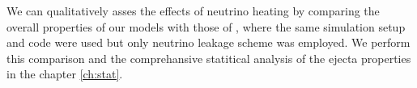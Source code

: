 We can qualitatively asses the effects of neutrino heating by comparing the overall 
properties of our models with those of \citet{Radice:2018pdn}, where the same 
simulation setup and code were used but only neutrino leakage scheme was employed.
%
We perform this comparison and the comprehansive statitical analysis of the 
ejecta properties in the chapter \ref{ch:stat}.
%
%
%



